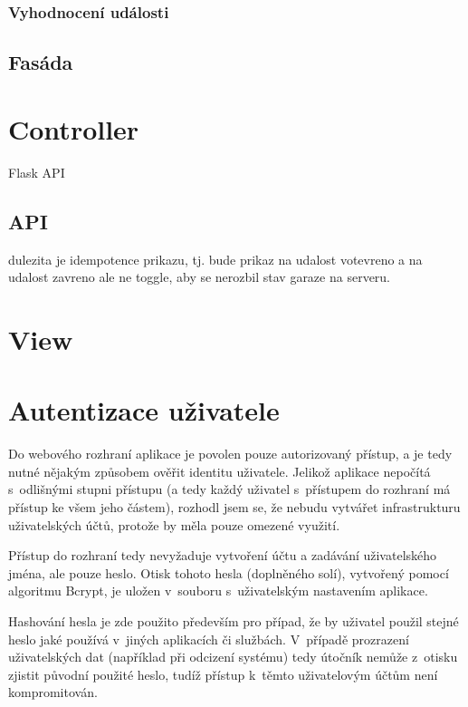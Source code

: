 \subsubsection{Vyhodnocení události}

\subsection{Fasáda}

\section{Controller}

Flask API

\subsection{API}

dulezita je idempotence prikazu, tj. bude prikaz na udalost votevreno a na udalost zavreno ale ne toggle, aby se nerozbil stav garaze na serveru.

\section{View}

\section{Autentizace uživatele}
\label{sec:de_auth}

Do webového rozhraní aplikace je povolen pouze autorizovaný přístup, a je tedy nutné nějakým způsobem ověřit identitu uživatele. Jelikož aplikace nepočítá s~odlišnými stupni přístupu (a tedy každý uživatel s~přístupem do rozhraní má přístup ke všem jeho částem), rozhodl jsem se, že nebudu vytvářet infrastrukturu uživatelských účtů, protože by měla pouze omezené využití.

Přístup do rozhraní tedy nevyžaduje vytvoření účtu a zadávání uživatelského jména, ale pouze heslo. Otisk tohoto hesla (doplněného solí), vytvořený pomocí algoritmu Bcrypt, je uložen v~souboru s~uživatelským nastavením aplikace.

Hashování hesla je zde použito především pro případ, že by uživatel použil stejné heslo jaké používá v~jiných aplikacích či službách. V~případě prozrazení uživatelských dat (například při odcizení systému) tedy útočník nemůže z~otisku zjistit původní použité heslo, tudíž přístup k~těmto uživatelovým účtům není kompromitován.

